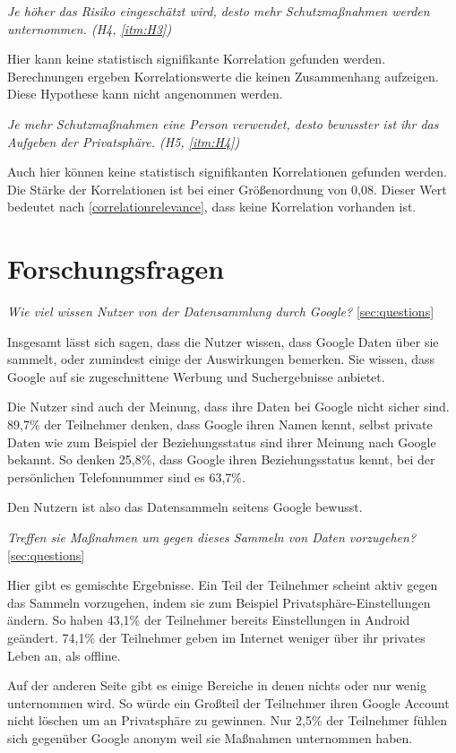 \textit{Je höher das Risiko eingeschätzt wird, desto mehr Schutzmaßnahmen werden unternommen. (H4, \ref{itm:H3})}

Hier kann keine statistisch signifikante Korrelation gefunden werden. Berechnungen ergeben Korrelationswerte die keinen Zusammenhang aufzeigen. Diese Hypothese kann nicht angenommen werden.

\textit{Je mehr Schutzmaßnahmen eine Person verwendet, desto bewusster ist ihr das Aufgeben der Privatsphäre. (H5, \ref{itm:H4})}

Auch hier können keine statistisch signifikanten Korrelationen gefunden werden. Die Stärke der Korrelationen ist bei einer Größenordnung von 0,08. Dieser Wert bedeutet nach \ref{correlationrelevance}, dass keine Korrelation vorhanden ist.

\section{Forschungsfragen}
\label{sec:forschungsfragen}
\textit{Wie viel wissen Nutzer von der Datensammlung durch Google?} \ref{sec:questions}

Insgesamt lässt sich sagen, dass die Nutzer wissen, dass Google Daten über sie sammelt, oder zumindest einige der Auswirkungen bemerken. Sie wissen, dass Google auf sie zugeschnittene Werbung und Suchergebnisse anbietet.

Die Nutzer sind auch der Meinung, dass ihre Daten bei Google nicht sicher sind. 89,7\% der Teilnehmer denken, dass Google ihren Namen kennt, selbst private Daten wie zum Beispiel der Beziehungsstatus sind ihrer Meinung nach Google bekannt. So denken 25,8\%, dass Google ihren Beziehungsstatus kennt, bei der persönlichen Telefonnummer sind es 63,7\%.

Den Nutzern ist also das Datensammeln seitens Google bewusst.

\textit{Treffen sie Maßnahmen um gegen dieses Sammeln von Daten vorzugehen?} \ref{sec:questions}

Hier gibt es gemischte Ergebnisse. Ein Teil der Teilnehmer scheint aktiv gegen das Sammeln vorzugehen, indem sie zum Beispiel Privatsphäre-Einstellungen ändern. So haben 43,1\% der Teilnehmer bereits Einstellungen in Android geändert. 74,1\% der Teilnehmer geben im Internet weniger über ihr privates Leben an, als offline.

Auf der anderen Seite gibt es einige Bereiche in denen nichts oder nur wenig unternommen wird. So würde ein Großteil der Teilnehmer ihren Google Account nicht löschen um an Privatsphäre zu gewinnen. Nur 2,5\% der Teilnehmer fühlen sich gegenüber Google anonym weil sie Maßnahmen unternommen haben.

